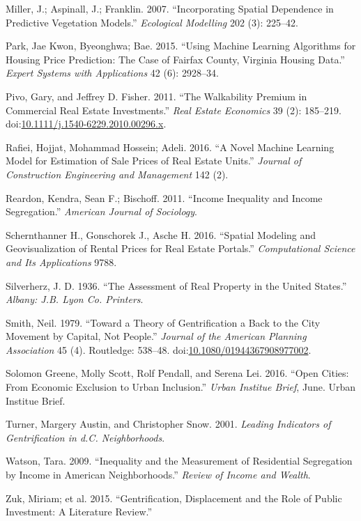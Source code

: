 \documentclass[]{article}
\begin{document}
\hypertarget{ref-Miller2015}{}
Miller, J.; Aspinall, J.; Franklin. 2007. ``Incorporating Spatial
Dependence in Predictive Vegetation Models.'' \emph{Ecological
Modelling} 202 (3): 225--42.

\hypertarget{ref-Park2015}{}
Park, Jae Kwon, Byeonghwa; Bae. 2015. ``Using Machine Learning
Algorithms for Housing Price Prediction: The Case of Fairfax County,
Virginia Housing Data.'' \emph{Expert Systems with Applications} 42 (6):
2928--34.

\hypertarget{ref-Pivo2011}{}
Pivo, Gary, and Jeffrey D. Fisher. 2011. ``The Walkability Premium in
Commercial Real Estate Investments.'' \emph{Real Estate Economics} 39
(2): 185--219.
doi:\href{https://doi.org/10.1111/j.1540-6229.2010.00296.x}{10.1111/j.1540-6229.2010.00296.x}.

\hypertarget{ref-Rafiei2016}{}
Rafiei, Hojjat, Mohammad Hossein; Adeli. 2016. ``A Novel Machine
Learning Model for Estimation of Sale Prices of Real Estate Units.''
\emph{Journal of Construction Engineering and Management} 142 (2).

\hypertarget{ref-Reardon2011}{}
Reardon, Kendra, Sean F.; Bischoff. 2011. ``Income Inequality and Income
Segregation.'' \emph{American Journal of Sociology}.

\hypertarget{ref-Schernthanner2016}{}
Schernthanner H., Gonschorek J., Asche H. 2016. ``Spatial Modeling and
Geovisualization of Rental Prices for Real Estate Portals.''
\emph{Computational Science and Its Applications} 9788.

\hypertarget{ref-Silverherz1936}{}
Silverherz, J. D. 1936. ``The Assessment of Real Property in the United
States.'' \emph{Albany: J.B. Lyon Co. Printers}.

\hypertarget{ref-Smith1979}{}
Smith, Neil. 1979. ``Toward a Theory of Gentrification a Back to the
City Movement by Capital, Not People.'' \emph{Journal of the American
Planning Association} 45 (4). Routledge: 538--48.
doi:\href{https://doi.org/10.1080/01944367908977002}{10.1080/01944367908977002}.

\hypertarget{ref-urban2016}{}
Solomon Greene, Molly Scott, Rolf Pendall, and Serena Lei. 2016. ``Open
Cities: From Economic Exclusion to Urban Inclusion.'' \emph{Urban
Institue Brief}, June. Urban Institue Brief.

\hypertarget{ref-Turner2001}{}
Turner, Margery Austin, and Christopher Snow. 2001. \emph{Leading
Indicators of Gentrification in d.C. Neighborhoods}.

\hypertarget{ref-Watson2009}{}
Watson, Tara. 2009. ``Inequality and the Measurement of Residential
Segregation by Income in American Neighborhoods.'' \emph{Review of
Income and Wealth}.

\hypertarget{ref-Zuk2015}{}
Zuk, Miriam; et al. 2015. ``Gentrification, Displacement and the Role of
Public Investment: A Literature Review.''
\end{document}
